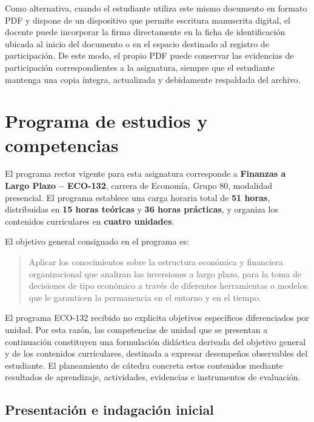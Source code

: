 \documentclass[10pt]{article}
\begin{document}
Como alternativa, cuando el estudiante utiliza este mismo documento en formato PDF y dispone de un dispositivo que permite escritura manuscrita digital, el docente puede incorporar la firma directamente en la ficha de identificación ubicada al inicio del documento o en el espacio destinado al registro de participación. De este modo, el propio PDF puede conservar las evidencias de participación correspondientes a la asignatura, siempre que el estudiante mantenga una copia íntegra, actualizada y debidamente respaldada del archivo.


\section{Programa de estudios y competencias}

El programa rector vigente para esta asignatura corresponde a
\textbf{Finanzas a Largo Plazo -- ECO-132}, carrera de Economía, Grupo 80,
modalidad presencial. El programa establece una carga horaria total de
\textbf{51 horas}, distribuidas en \textbf{15 horas teóricas} y
\textbf{36 horas prácticas}, y organiza los contenidos curriculares en
\textbf{cuatro unidades}.
\parencite{uaProgramaFinanzasLargoPlazo}

El objetivo general consignado en el programa es:

\begin{quote}
Aplicar los conocimientos sobre la estructura económica y financiera
organizacional que analizan las inversiones a largo plazo, para la toma de
decisiones de tipo económico a través de diferentes herramientas o modelos
que le garanticen la permanencia en el entorno y en el tiempo.
\end{quote}
\parencite{uaProgramaFinanzasLargoPlazo}

El programa ECO-132 recibido no explicita objetivos específicos diferenciados
por unidad. Por esta razón, las competencias de unidad que se presentan a
continuación constituyen una formulación didáctica derivada del objetivo general
y de los contenidos curriculares, destinada a expresar desempeños observables
del estudiante. El planeamiento de cátedra concreta estos contenidos mediante
resultados de aprendizaje, actividades, evidencias e instrumentos de evaluación.
\parencite{armoa2026planeamiento}

\subsection{Presentación e indagación inicial}
\end{document}
